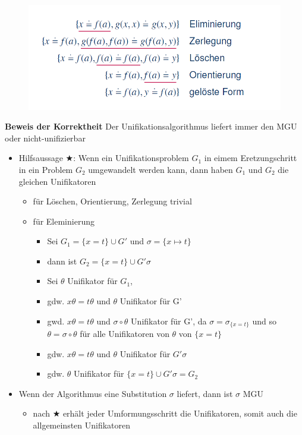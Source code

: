 \documentclass[12pt,a4paper]{article}
\begin{document}
\begin{figure}[H]
\includegraphics[scale=0.5]{./resources/uni_bsp.png}
\end{figure}

\textbf{Beweis der Korrektheit}
Der Unifikationsalgorithmus liefert immer den MGU oder nicht-unifizierbar
\begin{itemize}
\item Hilfsaussage $\bigstar$: Wenn ein Unifikationsproblem $G_1$ in eimem Eretzungschritt in ein Problem $G_2$ umgewandelt werden kann, dann haben $G_1$ und $G_2$ die gleichen Unifikatoren
\begin{itemize}
\item für Löschen, Orientierung, Zerlegung trivial
\item für Eleminierung
\begin{itemize}
\item Sei $G_1 = \{ x=t\} \cup G'$ und $\sigma = \{ x\mapsto t \}$
\item dann ist $G_2 = \{x=t\} \cup G'\sigma$
\item Sei $\theta$ Unifikator für $G_1$, 
\item gdw. $x\theta = t\theta$ und $\theta$ Unifikator für G'
\item gwd. $x\theta = t\theta$ und $\sigma\circ\theta$ Unifikator für G', da $\sigma = \sigma_{\{x=t\}}$ und so $\theta = \sigma \circ \theta$ für alle Unifikatoren von $\theta$ von $\{x=t\}$
\item gdw. $x\theta = t\theta$ und $\theta$ Unifikator für $G'\sigma$
\item gdw. $\theta$ Unifikator für $\{x=t\} \cup G'\sigma = G_2$
\end{itemize}
\end{itemize}
\item Wenn der Algorithmus eine Substitution $\sigma$ liefert, dann ist $\sigma$ MGU
\begin{itemize}
\item nach $\bigstar$ erhält jeder Umformungsschritt die Unifikatoren, somit auch die allgemeinsten Unifikatoren

\end{itemize}
\end{itemize}
\end{document}
